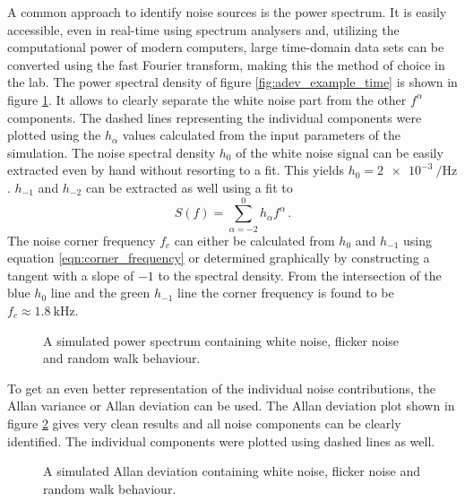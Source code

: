 A common approach to identify noise sources is the power spectrum. It is easily accessible, even in real-time using spectrum analysers and, utilizing the computational power of modern computers, large time-domain data sets can be converted using the fast Fourier transform, making this the method of choice in the lab. The power spectral density  of figure \ref{fig:adev_example_time} is shown in figure \ref{fig:adev_example_psd}. It allows to clearly separate the white noise part from the other $f^{\alpha}$ components. The dashed lines representing the individual components were plotted using the $h_\alpha$ values calculated from the input parameters of the simulation. The noise spectral density $h_0$ of the white noise signal can be easily extracted even by hand without resorting to a fit. This yields $h_{0} = \qty{2e-3}{\per \Hz} $. $h_{-1}$ and $h_{-2}$ can be extracted as well using a fit to
\begin{equation}
    S(f) = \sum_{\alpha = -2}^0 h_\alpha f^\alpha \, .
\end{equation}
The noise corner frequency $f_c$ can either be calculated from $h_0$ and $h_{-1}$ using equation \ref{eqn:corner_frequency} or determined graphically by constructing a tangent with a slope of $-1$ to the spectral density. From the intersection of the blue $h_0$ line and the green $h_{-1}$ line the corner frequency is found to be $f_c \approx \qty{1.8}{\kHz}$.
\begin{figure}[hb]
    \centering
    \caption{A simulated power spectrum containing white noise, flicker noise and random walk behaviour.}
    \label{fig:adev_example_psd}
\end{figure}

To get an even better representation of the individual noise contributions, the Allan variance or Allan deviation can be used. The Allan deviation plot shown in figure \ref{fig:adev_example_adev} gives very clean results and all noise components can be clearly identified. The individual components were plotted using dashed lines as well.
\begin{figure}[ht]
    \centering
    \caption{A simulated Allan deviation containing white noise, flicker noise and random walk behaviour.}
    \label{fig:adev_example_adev}
\end{figure}

